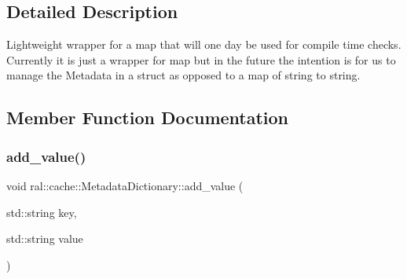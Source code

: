 \subsection{Detailed Description}
Lightweight wrapper for a map that will one day be used for compile time checks. Currently it is just a wrapper for map but in the future the intention is for us to manage the Metadata in a struct as opposed to a map of string to string. 

\subsection{Member Function Documentation}
\mbox{\label{classral_1_1cache_1_1MetadataDictionary_a99828bf2a71b8e06d568420e5c2b460d}} 
\subsubsection{\texorpdfstring{add\+\_\+value()}{add\_value()}\hspace{0.1cm}{\footnotesize\ttfamily [1/2]}}
{\footnotesize\ttfamily void ral\+::cache\+::\+Metadata\+Dictionary\+::add\+\_\+value (\begin{DoxyParamCaption}\item[{std\+::string}]{key,  }\item[{std\+::string}]{value }\end{DoxyParamCaption})\hspace{0.3cm}{\ttfamily [inline]}}

